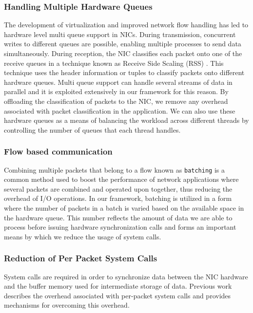 \documentclass[10pt, conference, compsocconf, reqno]{IEEEtran}
\newcommand{\comment}[1]{}
\begin{document}
\subsubsection{Handling Multiple Hardware Queues}

The development of virtualization and improved network flow handling has led to hardware level multi queue support in NICs. During transmission, concurrent writes to different queues are possible, enabling multiple processes to send data simultaneously. During reception, the NIC classifies each packet onto one of the receive queues in a technique known as Receive Side Scaling (RSS)\cite{micro2008} \cite{intel2010}. This technique uses the header information or tuples to classify packets onto different hardware queues. Multi queue support can handle several streams of data in parallel and it is exploited extensively in our framework for this reason. By offloading the classification of packets to the NIC, we remove any overhead associated with packet classification in the application. We can also use these hardware queues as a means of balancing the workload across different threads by controlling the number of queues that each thread handles. \comment{Since different processes can access these transmit and receive queues, concurrent access to data is possible.}

\subsubsection{Flow based communication}

Combining multiple packets that belong to a flow known as \texttt{batching} is a common method used to boost the performance of network applications where several packets are combined and operated upon together, thus reducing the overhead of I/O operations. In our framework, batching is utilized in a form where the number of packets in a batch is varied based on the available space in the hardware queue. This number reflects the amount of data we are able to process before issuing hardware synchronization calls and forms an important means by which we reduce the usage of system calls.

\subsubsection{Reduction of Per Packet System Calls}

System calls are required in order to synchronize data between the NIC hardware and the buffer memory used for intermediate storage of data. Previous work describes the overhead associated with per-packet system calls and provides mechanisms for overcoming this overhead\cite{1564468}\cite{Han:2010:PGS:1851275.1851207}\cite{Rizzo:2012:RNI:2090147.2103536}.
\end{document}
